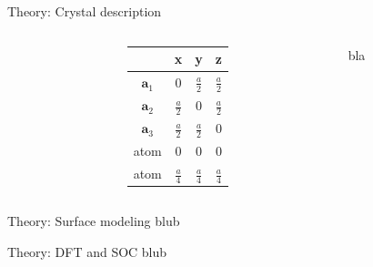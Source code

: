 \begin{frame}{Theory: Crystal description}
\begin{columns}
\begin{column}{.25\linewidth}
		\end{column}
		\hfill
		\begin{column}{.25\linewidth}
			\centering
			\begin{tabular}{c c c c} 
				\hline
				& \textbf{x} & \textbf{y} & \textbf{z}\\ 
				\hline 
				\vspace{0.2cm} 
				$\boldsymbol{a}_1$ & 0 & $\frac{a}{2}$ & $\frac{a}{2}$ \\
				\vspace{0.2cm}
				$\boldsymbol{a}_2$ & $\frac{a}{2}$ & 0 & $\frac{a}{2}$ \\
				\vspace{0.2cm}
				$\boldsymbol{a}_3$ & $\frac{a}{2}$ & $\frac{a}{2}$ & 0 \\
				\hline 
				\vspace{0.2cm}
				atom & 0 & 0 & 0 \\
				\vspace{0.2cm}
				atom & $\frac{a}{4}$ & $\frac{a}{4}$ & $\frac{a}{4}$
			\end{tabular}	
		\end{column}
		\begin{column}{.5\linewidth}
			bla
		\end{column}
	\end{columns}
\end{frame}

\begin{frame}{Theory: Surface modeling}
	blub
\end{frame}

\begin{frame}{Theory: DFT and SOC}
	blub
\end{frame}
